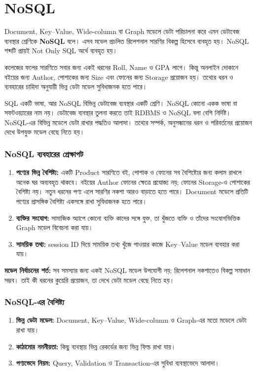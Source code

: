 \section{NoSQL}
\label{sec:ch06-nosql}
\begin{definitionbox}{}
Document, Key--Value, Wide-column বা Graph মডেলে ডেটা পরিচালনা করে এমন ডেটাবেজ ব্যবস্থার শ্রেণিকে \textbf{NoSQL} বলে। এসব মডেল প্রচলিত রিলেশনাল সারণির বিকল্প হিসেবে ব্যবহৃত হয়। NoSQL শব্দটি প্রায়ই Not Only SQL অর্থে ব্যবহৃত হয়।
\end{definitionbox}


কলেজের ফলের সারণিতে সবার জন্য একই ধরনের Roll, Name ও GPA লাগে। কিন্তু অনলাইন দোকানে বইয়ের জন্য Author, পোশাকের জন্য Size এবং ফোনের জন্য Storage প্রয়োজন হয়। তথ্যের ধরন ও ব্যবহারের চাহিদা অনুযায়ী ভিন্ন ডেটা মডেল সুবিধাজনক হতে পারে।

SQL একটি ভাষা, আর NoSQL বিভিন্ন ডেটাবেজ ব্যবস্থার একটি শ্রেণি। NoSQL কোনো একক ভাষা বা সফটওয়্যারের নাম নয়। ডেটাবেজ ব্যবস্থার তুলনা করতে তাই RDBMS ও NoSQL বলা বেশি নির্দিষ্ট। NoSQL-এর বিভিন্ন মডেলে ডেটা রাখার পদ্ধতিও আলাদা। তথ্যের সম্পর্ক, অনুসন্ধানের ধরন ও পরিবর্তনের প্রয়োজন দেখে উপযুক্ত মডেল বেছে নিতে হয়।


\subsubsection{NoSQL ব্যবহারের প্রেক্ষাপট}
\begin{enumerate}
\item \textbf{পণ্যের ভিন্ন বৈশিষ্ট্য:} একটি Product সারণিতে বই, পোশাক ও ফোনের সব বৈশিষ্ট্যের জন্য কলাম রাখলে অনেক ঘর অব্যবহৃত থাকবে। বইয়ের Author ফোনের ক্ষেত্রে প্রযোজ্য নয়; ফোনের Storage-ও পোশাকের বৈশিষ্ট্য নয়। নতুন ধরনের পণ্য এলে সারণির নকশা আরও বাড়াতে হতে পারে। Document মডেলে প্রতিটি পণ্যের প্রাসঙ্গিক বৈশিষ্ট্য একসঙ্গে রাখা সুবিধাজনক হতে পারে।
\item \textbf{ব্যক্তির সংযোগ:} সামাজিক অ্যাপে কোনো ব্যক্তি কাদের সঙ্গে যুক্ত, তা খুঁজতে ব্যক্তি ও তাঁদের সংযোগভিত্তিক Graph মডেল বিবেচনা করা যায়।
\item \textbf{সাময়িক তথ্য:} session ID দিয়ে সাময়িক তথ্য খুঁজে পাওয়ার কাজে Key--Value মডেল ব্যবহার করা যায়।
\end{enumerate}
\textbf{মডেল নির্বাচনের শর্ত:} সব সমস্যার জন্য একই NoSQL মডেল উপযোগী নয়; রিলেশনাল নকশাতেও বিকল্প সমাধান সম্ভব। তাই কী ধরনের কুয়েরি প্রয়োজন, তা দেখে ডেটা মডেল বেছে নিতে হয়।

\subsubsection{NoSQL-এর বৈশিষ্ট্য}
\begin{enumerate}
\item \textbf{ভিন্ন ডেটা মডেল:} Document, Key--Value, Wide-column ও Graph-এর মতো মডেলে ডেটা রাখা যায়।
\item \textbf{কাঠামোর নমনীয়তা:} কিছু ব্যবস্থায় ভিন্ন রেকর্ডের জন্য ভিন্ন ফিল্ড রাখা যায়।
\item \textbf{পণ্যভেদে নিয়ম:} Query, Validation ও Transaction-এর সুবিধা ব্যবস্থাভেদে আলাদা।
\end{enumerate}

